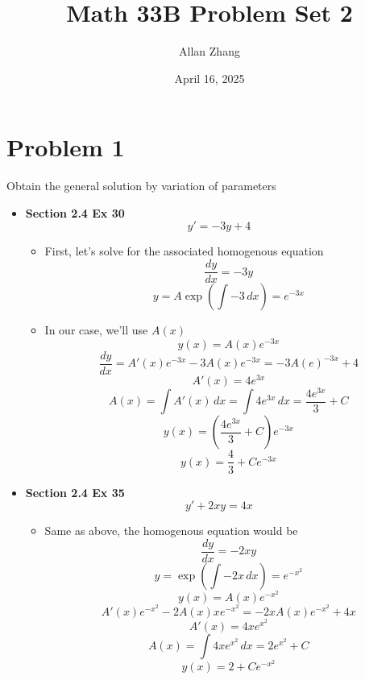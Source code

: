 \documentclass[hidelinks]{article}
\title{\textbf{Math 33B Problem Set 2}}
\author{Allan Zhang}
\date{April 16, 2025}
\begin{document}
\hypersetup{bookmarksnumbered=true,}
\pagecolor{white}
\color{black}
\maketitle 
\section*{Problem 1}
Obtain the general solution by variation of parameters
\begin{itemize}
    \item[ ] \textbf{Section 2.4 Ex 30} 
            \[
                y' = -3y + 4 
            \]
    \begin{itemize}
        \item[ ] First, let's solve for the associated homogenous equation 
        \[
            \frac{dy}{dx} = -3y
        \]
        \[
            y = A\exp(\int-3 \, dx) = e^{-3x}
        \]
        \item[ ] In our case, we'll use $A(x)$
        \[
            y(x) = A(x)e^{-3x}
        \]
        \[
            \frac{dy}{dx} = A'(x)e^{-3x} - 3A(x)e^{-3x} = -3A(e)^{-3x} + 4
        \]
        \[
            A'(x) = 4e^{3x}
        \]
        \[
            A(x) = \int A'(x) \, dx = \int 4e^{3x}\,dx = \frac{4e^{3x}}{3} + C
        \]
        \[
            y(x) = (\frac{4e^{3x}}{3} + C)e^{-3x}
        \]
        \[
            y(x) = \frac{4}{3} + Ce^{-3x}
        \]
    \end{itemize}

    \item[ ] \textbf{Section 2.4 Ex 35} 
            \[
                y' + 2xy = 4x 
            \]
    \begin{itemize}
        \item[ ]
        Same as above, the homogenous equation would be
        \[
            \frac{dy}{dx} = -2xy
        \]
        \[
            y = \exp(\int -2x \, dx) = e^{-x^2}
        \]
        \[
            y(x) = A(x) e^{-x^{2}}
        \]
        \[
            A'(x)e^{-x^2} - 2A(x)xe^{-x^2} = -2xA(x)e^{-x^2} + 4x
        \]
        \[
            A'(x) = 4xe^{x^2}
        \]
        \[
            A(x) = \int 4xe^{x^2} \, dx = 2e^{x^2} + C
        \]
        \[
            y(x) = 2 + Ce^{-x^2}
        \]
    \end{itemize}
\end{itemize}
\newpage
\end{document}
